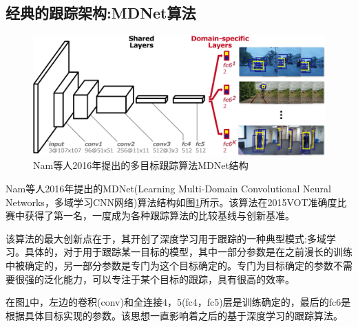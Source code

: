 \subsection{经典的跟踪架构:MDNet算法}
\par
\begin{figure}[htbp!]
    \centering
    \includegraphics[width = 1.\textwidth]{chap/img/mdnet_.png}
    \caption{Nam等人2016年提出的多目标跟踪算法MDNet结构\supercite{nam2016mdnet}}
    \label{fig:mdnet_arch}
\end{figure}
\par
Nam等人2016年提出的MDNet(Learning Multi-Domain Convolutional Neural Networks，多域学习CNN网络)算法结构如图\ref{fig:mdnet_arch}所示。该算法在2015VOT准确度比赛中获得了第一名，一度成为各种跟踪算法的比较基线与创新基准。
\par
该算法的最大创新点在于，其开创了深度学习用于跟踪的一种典型模式:多域学习。具体的，对于用于跟踪某一目标的模型，其中一部分参数是在之前漫长的训练中被确定的，另一部分参数是专门为这个目标确定的。专门为目标确定的参数不需要很强的泛化能力，可以专注于某个目标的跟踪，具有很高的效率。
\par
在图\ref{fig:mdnet_arch}中，左边的卷积(conv)和全连接4，5(fc4，fc5)层是训练确定的，最后的fc6是根据具体目标实现的参数。该思想一直影响着之后的基于深度学习的跟踪算法。
\par

